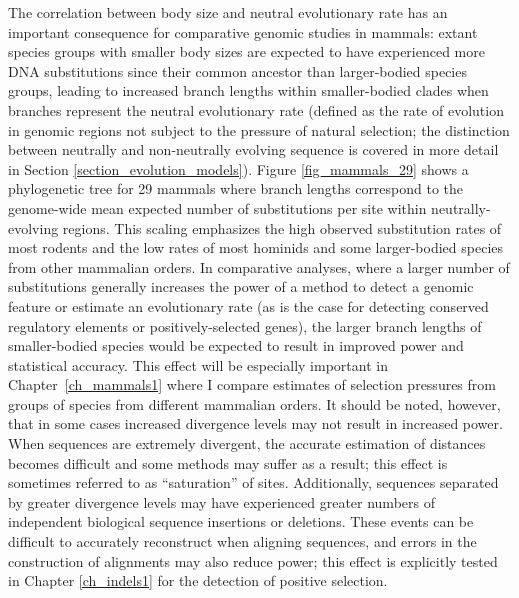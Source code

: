The correlation between body size and neutral evolutionary rate has an
important consequence for comparative genomic studies in mammals:
extant species groups with smaller body sizes are expected to have
experienced more DNA substitutions since their common ancestor than
larger-bodied species groups, leading to increased branch lengths
within smaller-bodied clades when branches represent the neutral
evolutionary rate (defined as the rate of evolution in genomic regions
not subject to the pressure of natural selection; the distinction
between neutrally and non-neutrally evolving sequence is covered in
more detail in Section \ref{section_evolution_models}). Figure
\ref{fig_mammals_29} shows a phylogenetic tree for 29 mammals where
branch lengths correspond to the genome-wide mean expected number of
substitutions per site within neutrally-evolving regions. This scaling
emphasizes the high observed substitution rates of most rodents and
the low rates of most hominids and some larger-bodied species from
other mammalian orders. In comparative analyses, where a larger number
of substitutions generally increases the power of a method to detect a
genomic feature or estimate an evolutionary rate (as is the case for
detecting conserved regulatory elements or positively-selected genes),
the larger branch lengths of smaller-bodied species would be expected
to result in improved power and statistical accuracy. This effect will
be especially important in Chapter~\ref{ch_mammals1} where I compare
\sw estimates of selection pressures from groups of species from
different mammalian orders. It should be noted, however, that in some
cases increased divergence levels may not result in increased
power. When sequences are extremely divergent, the accurate estimation
of distances becomes difficult and some methods may suffer as a
result; this effect is sometimes referred to as ``saturation'' of
sites.  Additionally, sequences separated by greater divergence levels
may have experienced greater numbers of independent biological
sequence insertions or deletions. These events can be difficult to
accurately reconstruct when aligning sequences, and errors in the
construction of alignments may also reduce power; this effect is
explicitly tested in Chapter \ref{ch_indels1} for the \sw detection of
positive selection.

